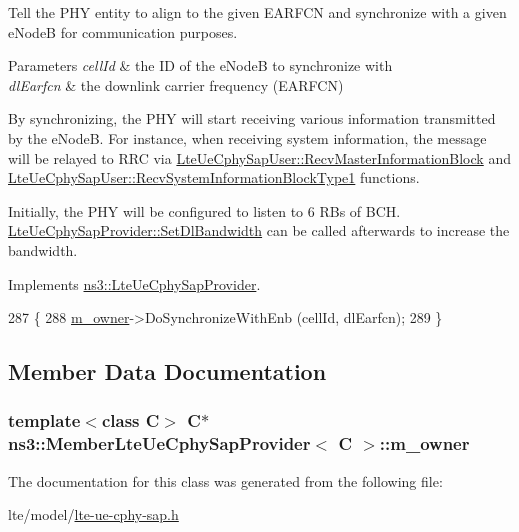 Tell the P\+HY entity to align to the given E\+A\+R\+F\+CN and synchronize with a given e\+NodeB for communication purposes. 


\begin{DoxyParams}{Parameters}
{\em cell\+Id} & the ID of the e\+NodeB to synchronize with \\
\hline
{\em dl\+Earfcn} & the downlink carrier frequency (E\+A\+R\+F\+CN)\\
\hline
\end{DoxyParams}
By synchronizing, the P\+HY will start receiving various information transmitted by the e\+NodeB. For instance, when receiving system information, the message will be relayed to R\+RC via \hyperlink{classns3_1_1LteUeCphySapUser_a6b48cc819f095ed29a7580f94f6765ec}{Lte\+Ue\+Cphy\+Sap\+User\+::\+Recv\+Master\+Information\+Block} and \hyperlink{classns3_1_1LteUeCphySapUser_aac4ef620b88531ba04617e024392a73e}{Lte\+Ue\+Cphy\+Sap\+User\+::\+Recv\+System\+Information\+Block\+Type1} functions.

Initially, the P\+HY will be configured to listen to 6 R\+Bs of B\+CH. \hyperlink{classns3_1_1LteUeCphySapProvider_a6b77b03695f82cd342c2462c9fe12e85}{Lte\+Ue\+Cphy\+Sap\+Provider\+::\+Set\+Dl\+Bandwidth} can be called afterwards to increase the bandwidth. 

Implements \hyperlink{classns3_1_1LteUeCphySapProvider_a94c755ff153113110e7b763dd8ee7b42}{ns3\+::\+Lte\+Ue\+Cphy\+Sap\+Provider}.


\begin{DoxyCode}
287 \{
288   \hyperlink{classns3_1_1MemberLteUeCphySapProvider_a5acff2ce8a59f367fa74fa321c088bd8}{m\_owner}->DoSynchronizeWithEnb (cellId, dlEarfcn);
289 \}
\end{DoxyCode}


\subsection{Member Data Documentation}
\subsubsection[{\texorpdfstring{m\+\_\+owner}{m_owner}}]{\setlength{\rightskip}{0pt plus 5cm}template$<$class C$>$ {\bf C}$\ast$ {\bf ns3\+::\+Member\+Lte\+Ue\+Cphy\+Sap\+Provider}$<$ {\bf C} $>$\+::m\+\_\+owner\hspace{0.3cm}{\ttfamily [private]}}\hypertarget{classns3_1_1MemberLteUeCphySapProvider_a5acff2ce8a59f367fa74fa321c088bd8}{}\label{classns3_1_1MemberLteUeCphySapProvider_a5acff2ce8a59f367fa74fa321c088bd8}


The documentation for this class was generated from the following file\+:\begin{DoxyCompactItemize}
\item 
lte/model/\hyperlink{lte-ue-cphy-sap_8h}{lte-\/ue-\/cphy-\/sap.\+h}\end{DoxyCompactItemize}
